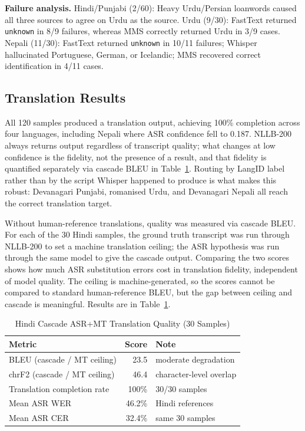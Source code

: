 \documentclass[conference]{IEEEtran}
\begin{document}
\textbf{Failure analysis.} Hindi/Punjabi (2/60): Heavy Urdu/Persian loanwords caused all three sources to agree on Urdu as the source. Urdu (9/30): FastText returned \texttt{unknown} in 8/9 failures, whereas MMS correctly returned Urdu in 3/9 cases. Nepali (11/30): FastText returned \texttt{unknown} in 10/11 failures; Whisper hallucinated Portuguese, German, or Icelandic; MMS recovered correct identification in 4/11 cases.

\subsection{Translation Results}
\label{sec:trans}

All 120 samples produced a translation output, achieving 100\% completion across four languages, including Nepali where ASR confidence fell to 0.187. NLLB-200 always returns output regardless of transcript quality; what changes at low confidence is the fidelity, not the presence of a result, and that fidelity is quantified separately via cascade BLEU in Table~\ref{tab:bleu}. Routing by LangID label rather than by the script Whisper happened to produce is what makes this robust: Devanagari Punjabi, romanised Urdu, and Devanagari Nepali all reach the correct translation target.

Without human-reference translations, quality was measured via cascade BLEU. For each of the 30 Hindi samples, the ground truth transcript was run through NLLB-200 to set a machine translation ceiling; the ASR hypothesis was run through the same model to give the cascade output. Comparing the two scores shows how much ASR substitution errors cost in translation fidelity, independent of model quality. The ceiling is machine-generated, so the scores cannot be compared to standard human-reference BLEU, but the gap between ceiling and cascade is meaningful. Results are in Table~\ref{tab:bleu}.

\begin{table}[htbp]
\caption{Hindi Cascade ASR+MT Translation Quality (30 Samples)}
\label{tab:bleu}
\begin{center}
\begin{tabular}{lrl}
\toprule
\textbf{Metric} & \textbf{Score} & \textbf{Note} \\
\midrule
BLEU (cascade / MT ceiling) & 23.5 & moderate degradation \\
chrF2 (cascade / MT ceiling) & 46.4 & character-level overlap \\
Translation completion rate  & 100\% & 30/30 samples \\
Mean ASR WER                 & 46.2\% & Hindi references \\
Mean ASR CER                 & 32.4\% & same 30 samples \\
\bottomrule
\end{tabular}
\end{center}
\end{table}
\end{document}
